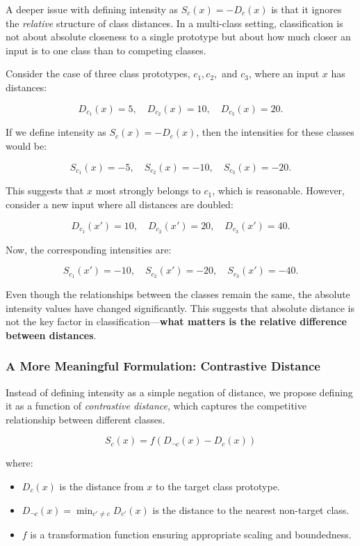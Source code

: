 A deeper issue with defining intensity as \( S_c(x) = -D_c(x) \) is that it ignores the \textit{relative} structure of class distances. In a multi-class setting, classification is not about absolute closeness to a single prototype but about how much closer an input is to one class than to competing classes.

Consider the case of three class prototypes, \( c_1, c_2, \) and \( c_3 \), where an input \( x \) has distances:

\[
D_{c_1}(x) = 5, \quad D_{c_2}(x) = 10, \quad D_{c_3}(x) = 20.
\]

If we define intensity as \( S_c(x) = -D_c(x) \), then the intensities for these classes would be:

\[
S_{c_1}(x) = -5, \quad S_{c_2}(x) = -10, \quad S_{c_3}(x) = -20.
\]

This suggests that \( x \) most strongly belongs to \( c_1 \), which is reasonable. However, consider a new input where all distances are doubled:

\[
D_{c_1}(x') = 10, \quad D_{c_2}(x') = 20, \quad D_{c_3}(x') = 40.
\]

Now, the corresponding intensities are:

\[
S_{c_1}(x') = -10, \quad S_{c_2}(x') = -20, \quad S_{c_3}(x') = -40.
\]

Even though the relationships between the classes remain the same, the absolute intensity values have changed significantly. This suggests that absolute distance is not the key factor in classification—\textbf{what matters is the relative difference between distances}.

\subsubsection{A More Meaningful Formulation: Contrastive Distance}

Instead of defining intensity as a simple negation of distance, we propose defining it as a function of \textit{contrastive distance}, which captures the competitive relationship between different classes.

\[
S_c(x) = f(D_{\neg c}(x) - D_c(x))
\]

where:

\begin{itemize}
    \item \( D_c(x) \) is the distance from \( x \) to the target class prototype.
    \item \( D_{\neg c}(x) = \min_{c' \neq c} D_{c'}(x) \) is the distance to the nearest non-target class.
    \item \( f \) is a transformation function ensuring appropriate scaling and boundedness.
\end{itemize}

